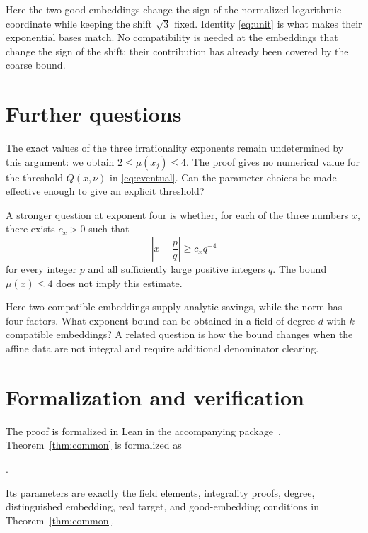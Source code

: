 \documentclass[11pt]{article}
\theoremstyle{definition}
\theoremstyle{remark}
\theoremstyle{plain}
\begin{document}
Here the two good embeddings change the sign of the normalized logarithmic
coordinate while keeping the shift \(\sqrt3\) fixed. Identity
\eqref{eq:unit} is what makes their exponential bases match. No
compatibility is needed at the embeddings that change the sign of the
shift; their contribution has already been covered by the coarse bound.

\section{Further questions}\label{sec:scope}
The exact values of the three irrationality exponents remain
undetermined by this argument: we obtain \(2\le\mu(x_j)\le4\).
The proof gives no numerical value for the threshold \(Q(x,\nu)\)
in \eqref{eq:eventual}. Can the parameter choices be made effective
enough to give an explicit threshold?

A stronger question at exponent four is whether, for each of the three
numbers \(x\), there exists \(c_x>0\) such that
\[
 \left|x-\frac pq\right|\ge c_xq^{-4}
\]
for every integer \(p\) and all sufficiently large positive integers
\(q\). The bound \(\mu(x)\le4\) does not imply this estimate.

Here two compatible embeddings supply analytic savings, while the norm
has four factors. What exponent bound can be obtained in a field of
degree \(d\) with \(k\) compatible embeddings? A related question is
how the bound changes when the affine data are not integral and require
additional denominator clearing.

\appendix
\section{Formalization and verification}\label{app:formalization}
The proof is formalized in Lean in the accompanying
 package~\cite{affine}.
Theorem~\ref{thm:common} is formalized as
\begin{center}\small
{}.
\end{center}
Its parameters are exactly the field elements, integrality proofs,
degree, distinguished embedding, real target, and good-embedding
conditions in Theorem~\ref{thm:common}.
\end{document}
